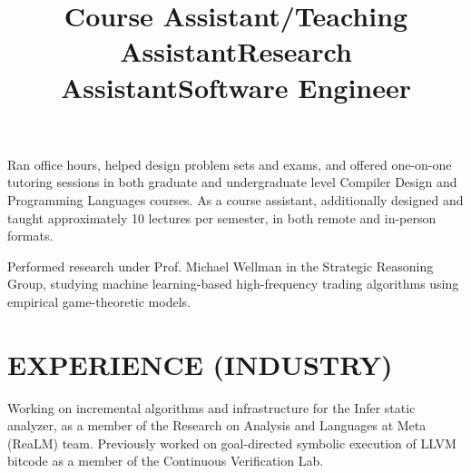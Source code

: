 \documentclass[margin]{res}
\begin{document}
\begin{resume}
\title{\textbf{Course Assistant}/\textbf{Teaching Assistant}}
\begin{position}
  Ran office hours, helped design problem sets and exams, and offered one-on-one tutoring sessions in both graduate and undergraduate level Compiler Design and Programming Languages courses.
  As a course assistant, additionally designed and taught approximately 10 lectures per semester, in both remote and in-person formats.
  \end{position}

\title{\textbf{Research Assistant}}
\begin{position}
Performed research under Prof. Michael Wellman in the Strategic Reasoning Group, studying machine learning-based high-frequency trading algorithms using empirical game-theoretic models.\end{position}
\section{EXPERIENCE (INDUSTRY)}
\title{\textbf{Software Engineer}}
\begin{position}
  Working on incremental algorithms and infrastructure for the Infer static analyzer, as a member of the Research on Analysis and Languages at Meta (ReaLM) team.
  Previously worked on goal-directed symbolic execution of LLVM bitcode as a member of the Continuous Verification Lab.
\end{position}


\end{resume}
\end{document}
